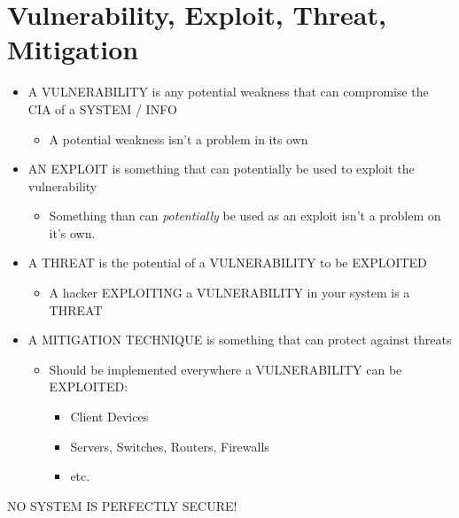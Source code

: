 \section{Vulnerability, Exploit, Threat,
Mitigation}\label{vulnerability-exploit-threat-mitigation}

\begin{itemize}
\tightlist
\item
  A VULNERABILITY is any potential weakness that can compromise the CIA
  of a SYSTEM / INFO

  \begin{itemize}
  \tightlist
  \item
    A potential weakness isn't a problem in its own
  \end{itemize}
\item
  AN EXPLOIT is something that can potentially be used to exploit the
  vulnerability

  \begin{itemize}
  \tightlist
  \item
    Something than can \emph{potentially} be used as an exploit isn't a
    problem on it's own.
  \end{itemize}
\item
  A THREAT is the potential of a VULNERABILITY to be EXPLOITED

  \begin{itemize}
  \tightlist
  \item
    A hacker EXPLOITING a VULNERABILITY in your system is a THREAT
  \end{itemize}
\item
  A MITIGATION TECHNIQUE is something that can protect against threats

  \begin{itemize}
  \tightlist
  \item
    Should be implemented everywhere a VULNERABILITY can be EXPLOITED:

    \begin{itemize}
    \tightlist
    \item
      Client Devices
    \item
      Servers, Switches, Routers, Firewalls
    \item
      etc.
    \end{itemize}
  \end{itemize}
\end{itemize}

\begin{tipbox}

NO SYSTEM IS PERFECTLY SECURE!

\end{tipbox}


